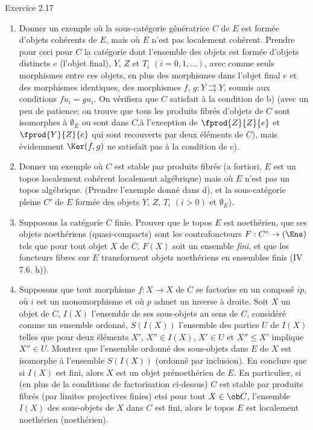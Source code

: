 \begin{enonce*}[remark]{Exercice 2.17}
\begin{enumerate}
\item Donner un exemple où la sous-catégorie génératrice $C$ de $E$
  est formée d'objets cohérents de $E$, mais où $E$ n'est pas
  localement cohérent. Prendre pour ceci pour $C$ la catégorie dont
  l'ensemble des objets est formée d'objets distincts $e$ (l'objet
  final), $Y$, $Z$ et $T_i$ $(i=0, 1, \ldots)$, avec comme seuls
  morphismes entre ces objets, en plus des morphismes dans l'objet
  final $e$ et des morphismes identiques, des morphismes $f$, $g : Y
  \rightrightarrows Y$, soumis aux conditions $fu_i = gu_i$. On
  vérifiera que $C$ satisfait à la condition de b) (avec un peu de
  patience; on trouve que tous les produits fibrés d'objets de $C$
  sont isomorphes à $∅_E$ ou sont dans $C$,\pageoriginale à
  l'exception de $\fprod{Z}{Z}{e}$ et $\fprod{Y}{Z}{e}$ qui sont recouverts par deux
  éléments de $C$), mais évidemment $\Ker(f, g)$ ne satisfait pas à la
  condition de c).

\item Donner un exemple où $C$ est stable par produits fibrés (a
  fortiori, $E$ est un topos localement cohérent \ie localement
  algébrique) mais où $E$ n'est pas un topos algébrique. (Prendre
  l'exemple donné dans d), et la sous-catégorie pleine $C'$ de $E$
  formée des objets $Y$, $Z$, $T_{i}$ $(i > 0)$ et $∅_{E}$).

\item Supposons la catégorie $C$ finie. Prouver que le topos $E$ est
  noethérien, que ses objets noethériens (\ie quasi-compacts) sont les
  contrafoncteurs $F : C^{\circ} \to (\Ens)$ tels que pour tout objet
  $X$ de $C$, $F(X)$ soit un ensemble \emph{fini}, et que les
  foncteurs fibres sur $E$ transforment objets noethériens en
  ensembles finis (\cf IV 7.6. h)).

\item Supposons que tout morphisme $f: X \to X$ de $C$ se factorise en
  un composé $ip$, où $i$ est un monomorphisme et où $p$ admet un
  inverse à droite. Soit $X$ un objet de $C$, $I(X)$ l'ensemble de ses
  sous-objets au sens de $C$, considéré comme un ensemble ordonné,
  $S(I(X))$ l'ensemble des parties $U$ de $I(X)$ telles que pour deux
  éléments $X'$, $X'' \in I(X)$, $X'\in U$ et $X''\leq X'$ implique
  $X''\in U$. Montrer que l'ensemble ordonné des sous-objets dans $E$
  de $X$ est isomorphe à l'ensemble $S(I(X))$ (ordonné par
  inclusion). En conclure que si $I(X)$ est fini, alors $X$ est un
  objet prénoethérien de $E$. En particulier, si (en plus de la
  conditions de factorisation ci-dessus) $C$ est stable par produits
  fibrés (\resp par limites projectives finies) et\pageoriginale si
  pour tout $X \in
  \ob C$, l'ensemble $I(X)$ des sous-objets de $X$ dans $C$ est fini,
  alors le topos $E$ est localement noethérien (\resp noethérien).


\end{enumerate}
\end{enonce*}
